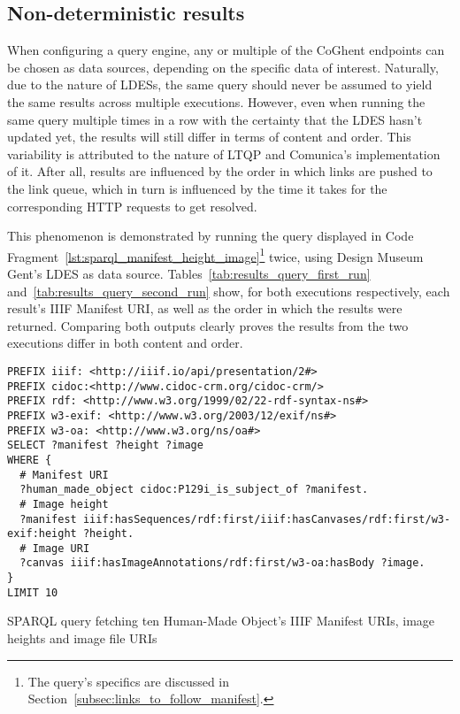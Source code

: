 \subsection{Non-deterministic results}

When configuring a query engine, any or multiple of the CoGhent endpoints can be chosen as data sources, depending on the specific data of interest. Naturally, due to the nature of LDESs, the same query should never be assumed to yield the same results across multiple executions. However, even when running the same query multiple times in a row with the certainty that the LDES hasn't updated yet, the results will still differ in terms of content and order. This variability is attributed to the nature of LTQP and Comunica's implementation of it. After all, results are influenced by the order in which links are pushed to the link queue, which in turn is influenced by the time it takes for the corresponding HTTP requests to get resolved.

This phenomenon is demonstrated by running the query displayed in Code Fragment~\ref{lst:sparql_manifest_height_image}\footnote{The query's specifics are discussed in Section~\ref{subsec:links_to_follow_manifest}.} twice, using Design Museum Gent's LDES as data source. Tables~\ref{tab:results_query_first_run} and~\ref{tab:results_query_second_run} show, for both executions respectively, each result's IIIF Manifest URI, as well as the order in which the results were returned. Comparing both outputs clearly proves the results from the two executions differ in both content and order.

\begin{listing}[htbp]
    \begin{verbatim}
PREFIX iiif: <http://iiif.io/api/presentation/2#>
PREFIX cidoc:<http://www.cidoc-crm.org/cidoc-crm/>
PREFIX rdf: <http://www.w3.org/1999/02/22-rdf-syntax-ns#>
PREFIX w3-exif: <http://www.w3.org/2003/12/exif/ns#>
PREFIX w3-oa: <http://www.w3.org/ns/oa#>
SELECT ?manifest ?height ?image
WHERE {
  # Manifest URI
  ?human_made_object cidoc:P129i_is_subject_of ?manifest.
  # Image height
  ?manifest iiif:hasSequences/rdf:first/iiif:hasCanvases/rdf:first/w3-exif:height ?height.
  # Image URI
  ?canvas iiif:hasImageAnnotations/rdf:first/w3-oa:hasBody ?image.
}
LIMIT 10
    \end{verbatim}
    \caption{SPARQL query fetching ten Human-Made Object's IIIF Manifest URIs, image heights and image file URIs}
    \label{lst:sparql_manifest_height_image}
\end{listing}

